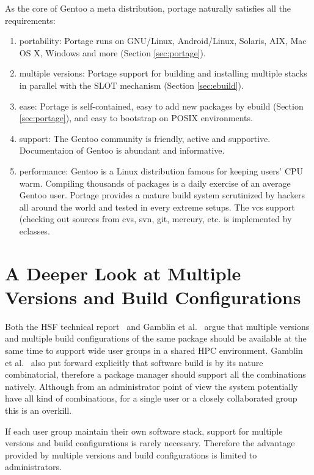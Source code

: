 \documentclass[a4paper,conference]{IEEEtran}
\begin{document}
As the core of Gentoo a meta distribution, portage naturally satisfies
all the requirements:

\begin{enumerate}
\item portability: Portage runs on GNU/Linux, Android/Linux, Solaris,
  AIX, Mac OS X, Windows and more (Section \ref{sec:portage}).
\item multiple versions: Portage support for building and installing
  multiple stacks in parallel with the SLOT mechanism
  (Section \ref{sec:ebuild}).
\item ease: Portage is self-contained, easy to add new packages by
  ebuild (Section \ref{sec:portage}), and easy to bootstrap on POSIX
  environments.
\item support: The Gentoo community is friendly, active and
  supportive.  Documentaion of Gentoo is abundant and informative.
\item performance: Gentoo is a Linux distribution famous for keeping
  users' CPU warm.  Compiling thousands of packages is a daily
  exercise of an average Gentoo user.  Portage provides a mature build
  system scrutinized by hackers all around the world and tested in
  every extreme setups. The vcs support (checking out sources from
  cvs, svn, git, mercury, etc. is implemented by eclasses.
\end{enumerate}

\section{A Deeper Look at Multiple Versions and Build Configurations}
Both the HSF technical report~\cite{hsf:package} and Gamblin et
al.~\cite{spack} argue that multiple versions and multiple build
configurations of the same package should be available at the same
time to support wide user groups in a shared HPC environment.  Gamblin
et al.~\cite{spack} also put forward explicitly that software build is
by its nature combinatorial, therefore a package manager should
support all the combinations natively.  Although from an administrator
point of view the system potentially have all kind of combinations,
for a single user or a closely collaborated group this is an overkill.

If each user group maintain their own software stack, support for
multiple versions and build configurations is rarely necessary.
Therefore the advantage provided by multiple versions and build
configurations is limited to administrators.
\end{document}
